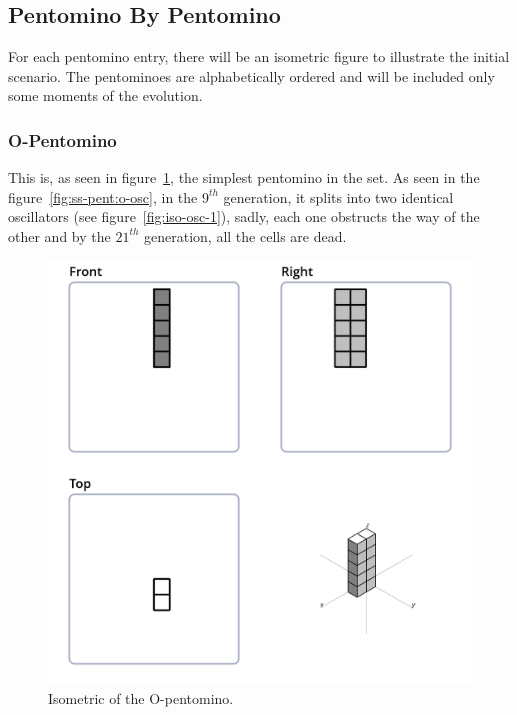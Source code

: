 
\subsection{Pentomino By Pentomino}
For each pentomino entry, there will be an isometric figure to illustrate the
initial scenario. The pentominoes are alphabetically ordered and will be included
only some moments of the evolution.

\subsubsection{O-Pentomino}
\label{sec:o-pentomino}

This is, as seen in figure~\ref{fig:iso-pent-o}, the simplest pentomino in the
set. As seen in the figure~\ref{fig:ss-pent:o-osc}, in the $9^{th}$ generation,
it splits into two identical oscillators (see figure~\ref{fig:iso-osc-1}),
sadly, each one obstructs the way of the other and by the $21^{th}$ generation,
all the cells are dead.

\begin{figure}
	\centering
	\includegraphics[scale=0.3]{iso_diagrams/o.png}
	\caption{Isometric of the O-pentomino.}
  \label{fig:iso-pent-o}
\end{figure}

